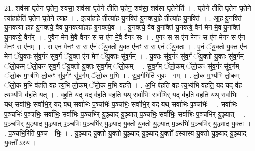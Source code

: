 \documentclass[17pt]{extarticle}
\begin{document}
21. शव॑सा घृ॒तेन॑ घृ॒तेन॒ शव॑सा॒ शव॑सा घृ॒तेने तीति॑ घृ॒तेन॒ शव॑सा॒ शव॑सा घृ॒तेनेति॑ । . घृ॒तेने तीति॑ घृ॒तेन॑ घृ॒तेने त्या॑हा॒हेति॑ घृ॒तेन॑ घृ॒तेने त्या॑ह । . इत्या॑हा॒हे तीत्या॑ह यु॒नक्ति॑ यु॒नक्त्या॒हे तीत्या॑ह यु॒नक्ति॑ । . आ॒ह॒ यु॒नक्ति॑ यु॒नक्त्या॑ हाह यु॒नक्त्ये॒ वैव यु॒नक्त्या॑हाह यु॒नक्त्ये॒व । . यु॒नक्त्ये॒ वैव यु॒नक्ति॑ यु॒नक्त्ये॒ वैन॑ मेन मे॒व यु॒नक्ति॑ यु॒नक्त्ये॒ वैन᳚म् । . ए॒वैन॑ मेन मे॒वै वैनꣳ॒॒ स स ए॑न मे॒वै वैनꣳ॒॒ सः । . ए॒नꣳ॒॒ स स ए॑न मेनꣳ॒॒ स ए॑न मेनꣳ॒॒ स ए॑न मेनꣳ॒॒ स ए॑नम् । . स ए॑न मेनꣳ॒॒ स स ए॑नं ॅयु॒क्तो यु॒क्त ए॑नꣳ॒॒ स स ए॑नं ॅयु॒क्तः । . ए॒नं॒ ॅयु॒क्तो यु॒क्त ए॑न मेनं ॅयु॒क्तः सु॑व॒र्गꣳ सु॑व॒र्गं ॅयु॒क्त ए॑न मेनं ॅयु॒क्तः सु॑व॒र्गम् । . यु॒क्तः सु॑व॒र्गꣳ सु॑व॒र्गं ॅयु॒क्तो यु॒क्तः सु॑व॒र्गम् ॅलो॒कम् ॅलो॒कꣳ सु॑व॒र्गं ॅयु॒क्तो यु॒क्तः सु॑व॒र्गम् ॅलो॒कम् । . सु॒व॒र्गम् ॅलो॒कम् ॅलो॒कꣳ सु॑व॒र्गꣳ सु॑व॒र्गम् ॅलो॒क म॒भ्य॑भि लो॒कꣳ सु॑व॒र्गꣳ सु॑व॒र्गम् ॅलो॒क म॒भि । . सु॒व॒र्गमिति॑ सुवः - गम् । . लो॒क म॒भ्य॑भि लो॒कम् ॅलो॒क म॒भि व॑हति वह त्य॒भि लो॒कम् ॅलो॒क म॒भि व॑हति । . अ॒भि व॑हति वह त्य॒भ्य॑भि व॑हति॒ यद् यद् व॑ह त्य॒भ्य॑भि व॑हति॒ यत् । . व॒ह॒ति॒ यद् यद् व॑हति वहति॒ यथ् सर्वा॑भिः॒ सर्वा॑भि॒र् यद् व॑हति वहति॒ यथ् सर्वा॑भिः । . यथ् सर्वा॑भिः॒ सर्वा॑भि॒र् यद् यथ् सर्वा॑भिः प॒ञ्चभिः॑ प॒ञ्चभिः॒ सर्वा॑भि॒र् यद् यथ् सर्वा॑भिः प॒ञ्चभिः॑ । . सर्वा॑भिः प॒ञ्चभिः॑ प॒ञ्चभिः॒ सर्वा॑भिः॒ सर्वा॑भिः प॒ञ्चभि॑र् यु॒ञ्ज्याद् यु॒ञ्ज्यात् प॒ञ्चभिः॒ सर्वा॑भिः॒ सर्वा॑भिः प॒ञ्चभि॑र् यु॒ञ्ज्यात् । . प॒ञ्चभि॑र् यु॒ञ्ज्याद् यु॒ञ्ज्यात् प॒ञ्चभिः॑ प॒ञ्चभि॑र् यु॒ञ्ज्याद् यु॒क्तो यु॒क्तो यु॒ञ्ज्यात् प॒ञ्चभिः॑ प॒ञ्चभि॑र् यु॒ञ्ज्याद् यु॒क्तः । . प॒ञ्चभि॒रिति॑ प॒ञ्च - भिः॒ । . यु॒ञ्ज्याद् यु॒क्तो यु॒क्तो यु॒ञ्ज्याद् यु॒ञ्ज्याद् यु॒क्तो᳚ ऽस्यास्य यु॒क्तो यु॒ञ्ज्याद् यु॒ञ्ज्याद् यु॒क्तो᳚ ऽस्य । \newline
\end{document}
